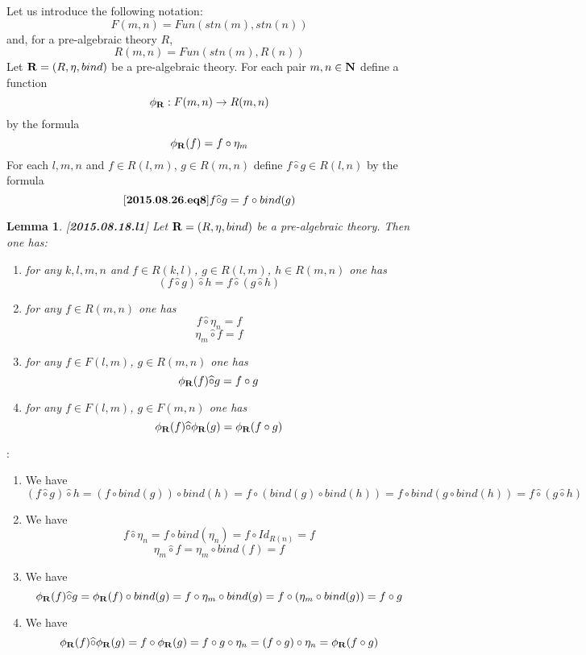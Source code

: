 \documentclass[11pt]{article}
\newenvironment{eq}{\begin{equation}}{\end{equation}}
\newenvironment{proof}{{\bf Proof}:}{\vskip 5mm }
\newtheorem{lemma}[proposition]{Lemma}
\newcommand{\llabel}[1]{\label{#1}[{\bf #1}]}
\newcommand{\sr}{\rightarrow}
\newcommand{\nn}{{\bf N\rm}}
\newcommand{\wh}{\widehat}
\newcommand{\bind}{bind}
\newcommand{\hc}{\wh{\circ}}
\begin{document}
Let us introduce the following notation:
%
$$F(m,n)=Fun(stn(m),stn(n))$$
%
and, for a pre-algebraic theory $R$,
%
$$R(m,n)=Fun(stn(m),R(n))$$
%
Let ${\bf R}=(R,\eta,bind)$ be a pre-algebraic theory. For each pair $m,n\in\nn$ define a function
%
$$\phi_{\bf R}:F(m,n)\sr R(m,n)$$
%
by the formula
%
$$\phi_{\bf R}(f)=f\circ \eta_m$$
%
For each $l,m,n$ and $f\in R(l,m)$, $g\in R(m,n)$ define $f\hc g\in R(l,n)$ by the formula
%
\begin{eq}\llabel{2015.08.26.eq8}
f\hc g = f\circ \bind(g)
\end{eq}
%
\begin{lemma}
\llabel{2015.08.18.l1}
Let ${\bf R}=(R,\eta,\bind)$ be a pre-algebraic theory. Then one has:
%
\begin{enumerate}
\item for any $k,l,m,n$ and $f\in R(k,l)$, $g\in R(l,m)$, $h\in R(m,n)$ one has
%
$$(f\hc g)\hc h=f\hc(g\hc h)$$
%
\item for any $f\in R(m,n)$ one has
%
$$f\hc \eta_n=f$$
$$\eta_m\hc f=f$$
%
\item for any $f\in F(l,m)$, $g\in R(m,n)$ one has
%
$$\phi_{\bf R}(f)\hc g=f\circ g$$
%
\item for any $f\in F(l,m)$, $g\in F(m,n)$ one has
%
$$\phi_{\bf R}(f)\hc \phi_{\bf R}(g)=\phi_{\bf R}(f\circ g)$$
%
\end{enumerate}
\end{lemma}
%
\begin{proof}
\begin{enumerate}
\item We have
%
$$(f\hc g)\hc h=(f\circ \bind(g))\circ \bind(h)=f\circ (\bind(g)\circ \bind(h))=f\circ \bind(g\circ \bind(h))=f\hc (g\hc h)$$
%
\item We have
%
$$f\hc \eta_n=f\circ \bind(\eta_n)=f\circ Id_{R(n)}=f$$
$$\eta_m\hc f=\eta_m\circ \bind(f)=f$$
%
\item We have 
%
$$\phi_{\bf R}(f)\hc g=\phi_{\bf R}(f)\circ \bind(g)=f\circ \eta_m\circ \bind(g)=f\circ (\eta_m\circ \bind(g))=f\circ g$$
%
\item We have
%
$$\phi_{\bf R}(f)\hc \phi_{\bf R}(g)=f\circ \phi_{\bf R}(g)=f\circ g\circ \eta_n=(f\circ g)\circ \eta_n=\phi_{\bf R}(f\circ g)$$
%
\end{enumerate}
\end{proof}
%
\end{document}
